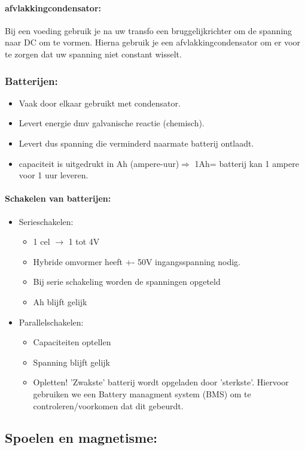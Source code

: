 \documentclass[12pt]{article}
\begin{document}
\paragraph{afvlakkingcondensator:}
Bij een voeding gebruik je na uw transfo een bruggelijkrichter om de spanning naar DC om te vormen. Hierna gebruik je een afvlakkingcondensator om er voor te zorgen dat uw spanning niet constant wisselt.
\subsubsection{Batterijen:}
\begin{itemize}
    \item Vaak door elkaar gebruikt met condensator.
    \item Levert energie dmv galvanische reactie (chemisch).
    \item Levert dus spanning die verminderd naarmate batterij ontlaadt.
    \item capaciteit is uitgedrukt in Ah (ampere-uur)$\Rightarrow$ 1Ah= batterij kan 1 ampere voor 1 uur leveren.
\end{itemize}
\paragraph{Schakelen van batterijen:}
\begin{itemize}
    \item Serieschakelen:\begin{itemize}
        \item 1 cel $\rightarrow$ 1 tot 4V 
        \item Hybride omvormer heeft +- 50V ingangsspanning nodig.
        \item Bij serie schakeling worden de spanningen opgeteld
        \item Ah blijft gelijk
    \end{itemize}
    \item Parallelschakelen:\begin{itemize}
        \item Capaciteiten optellen
        \item Spanning blijft gelijk
        \item Opletten! 'Zwakste' batterij wordt opgeladen door 'sterkste'.
        Hiervoor gebruiken we een Battery managment system (BMS) om te controleren/voorkomen dat dit gebeurdt.
    \end{itemize}
\end{itemize}
\subsection{Spoelen en magnetisme:}
\end{document}
